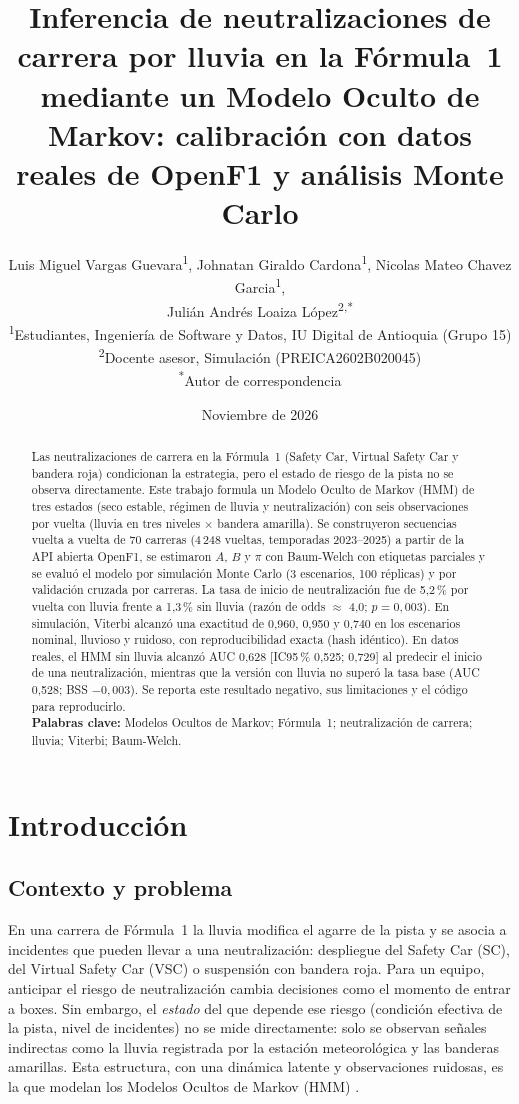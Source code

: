 \documentclass[11pt,letterpaper]{article}
\title{\textbf{Inferencia de neutralizaciones de carrera por lluvia en la Fórmula~1 mediante un Modelo Oculto de Markov: calibración con datos reales de OpenF1 y análisis Monte Carlo}}
\author{Luis Miguel Vargas Guevara\textsuperscript{1}, Johnatan Giraldo Cardona\textsuperscript{1}, Nicolas Mateo Chavez Garcia\textsuperscript{1},\\ Julián Andrés Loaiza López\textsuperscript{2,*}\\[0.2cm]
\small \textsuperscript{1}Estudiantes, Ingeniería de Software y Datos, IU Digital de Antioquia (Grupo 15)\\
\small \textsuperscript{2}Docente asesor, Simulación (PREICA2602B020045)\\
\small \textsuperscript{*}Autor de correspondencia}
\date{Noviembre de 2026}
\begin{document}
\maketitle

\begin{abstract}
\noindent Las neutralizaciones de carrera en la Fórmula~1 (Safety Car, Virtual Safety Car y bandera roja) condicionan la estrategia, pero el estado de riesgo de la pista no se observa directamente. Este trabajo formula un Modelo Oculto de Markov (HMM) de tres estados (seco estable, régimen de lluvia y neutralización) con seis observaciones por vuelta (lluvia en tres niveles $\times$ bandera amarilla). Se construyeron secuencias vuelta a vuelta de 70 carreras (4\,248 vueltas, temporadas 2023--2025) a partir de la API abierta OpenF1, se estimaron $A$, $B$ y $\pi$ con Baum-Welch con etiquetas parciales y se evaluó el modelo por simulación Monte Carlo (3 escenarios, 100 réplicas) y por validación cruzada por carreras. La tasa de inicio de neutralización fue de 5,2\,\% por vuelta con lluvia frente a 1,3\,\% sin lluvia (razón de odds $\approx$ 4,0; $p=0{,}003$). En simulación, Viterbi alcanzó una exactitud de 0,960, 0,950 y 0,740 en los escenarios nominal, lluvioso y ruidoso, con reproducibilidad exacta (hash idéntico). En datos reales, el HMM sin lluvia alcanzó AUC 0,628 [IC95\,\% 0,525; 0,729] al predecir el inicio de una neutralización, mientras que la versión con lluvia no superó la tasa base (AUC 0,528; BSS $-0{,}003$). Se reporta este resultado negativo, sus limitaciones y el código para reproducirlo.\\[0.2cm]
\textbf{Palabras clave:} Modelos Ocultos de Markov; Fórmula~1; neutralización de carrera; lluvia; Viterbi; Baum-Welch.
\end{abstract}

\section{Introducción}
\subsection{Contexto y problema}
En una carrera de Fórmula~1 la lluvia modifica el agarre de la pista y se asocia a incidentes que pueden llevar a una neutralización: despliegue del Safety Car (SC), del Virtual Safety Car (VSC) o suspensión con bandera roja. Para un equipo, anticipar el riesgo de neutralización cambia decisiones como el momento de entrar a boxes. Sin embargo, el \emph{estado} del que depende ese riesgo (condición efectiva de la pista, nivel de incidentes) no se mide directamente: solo se observan señales indirectas como la lluvia registrada por la estación meteorológica y las banderas amarillas. Esta estructura, con una dinámica latente y observaciones ruidosas, es la que modelan los Modelos Ocultos de Markov (HMM) \cite{rabiner1989}.
\end{document}
